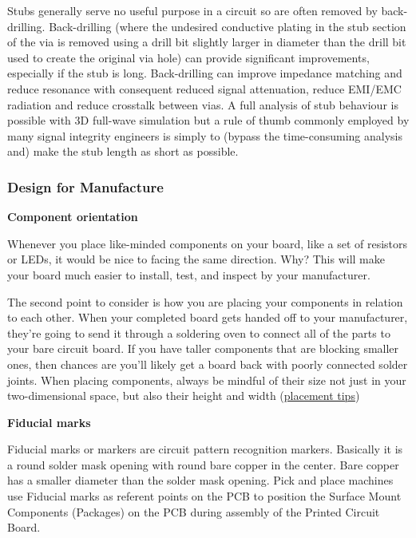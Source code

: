 \documentclass[final]{cubedoc}
\begin{document}
	Stubs generally serve no useful purpose in a circuit so are often removed by back-drilling. Back-drilling (where the undesired conductive plating in the stub section of the via is removed using a drill bit slightly larger in diameter than the drill bit used to create the original via hole) can provide significant improvements, especially if the stub is long. Back-drilling can improve impedance matching and reduce resonance with consequent reduced signal attenuation, reduce EMI/EMC radiation and reduce crosstalk between vias. A full analysis of stub behaviour is possible with 3D full-wave simulation but a rule of thumb commonly employed by many signal integrity engineers is simply to (bypass the time-consuming analysis and) make the stub length as short as possible.
	
	\subsubsection{Design for Manufacture}
	
	\textbf{Component orientation}
	
	Whenever you place like-minded components on your board, like a set of resistors or LEDs, it would be nice to facing the same direction. Why? This will make your board much easier to install, test, and inspect by your manufacturer.
	
	The second point to consider is how you are placing your components in relation to each other. When your completed board gets handed off to your manufacturer, they’re going to send it through a soldering oven to connect all of the parts to your bare circuit board. If you have taller components that are blocking smaller ones, then chances are you’ll likely get a board back with poorly connected solder joints. When placing components, always be mindful of their size not just in your two-dimensional space, but also their height and width (\href{https://www.autodesk.com/products/eagle/blog/top-10-pcb-component-placement-tips-pcb-beginner/}{placement tips})
	
	\textbf{Fiducial marks}
	
	Fiducial marks or markers are circuit pattern recognition markers. Basically it is a round solder mask opening with round bare copper in the center. Bare copper has a smaller diameter than the solder mask opening. Pick and place machines use Fiducial marks as referent points on the PCB to position the Surface Mount Components (Packages) on the PCB during assembly of the Printed Circuit Board.
	
\end{document}
